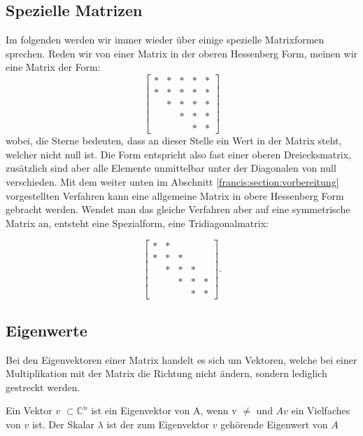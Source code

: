 \subsection{Spezielle Matrizen\label{francis:section:grundlagen:spezielle_matrizen}}
Im folgenden werden wir immer wieder über einige spezielle Matrixformen sprechen.
Reden wir von einer Matrix in der oberen Hessenberg Form, meinen wir eine Matrix der Form:
\begin{equation}
	\begin{bmatrix}
	* & * & * & * & * \\
	* & * & * & * & * \\
	& * & * & * & * \\
	&   & * & * & * \\
	&   &   & * & *
	\end{bmatrix}
\end{equation}
wobei, die Sterne bedeuten, dass an dieser Stelle ein Wert in der Matrix steht, welcher nicht null ist.
Die Form entspricht also fast einer oberen Dreiecksmatrix, zusätzlich sind aber alle Elemente unmittelbar unter der Diagonalen von null verschieden.
Mit dem weiter unten im Abschnitt \ref{francis:section:vorbereitung} vorgestellten Verfahren kann eine allgemeine Matrix in obere Hessenberg Form gebracht werden. Wendet man das gleiche Verfahren aber auf eine symmetrische Matrix an, entsteht eine Spezialform, eine Tridiagonalmatrix:

\begin{equation}
	\begin{bmatrix}
	* & * &   &   &   \\
	* & * & *  &   &   \\
	& * & * & * &  \\
	&   & * & * & * \\
	&   &   & * & *
	\end{bmatrix}.
\end{equation}

\subsection{Eigenwerte\label{francis:section:grundlagen:eigenwerte}}
Bei den Eigenvektoren einer Matrix handelt es sich um Vektoren, welche bei einer Multiplikation mit der Matrix die Richtung nicht ändern, sondern lediglich gestreckt werden.

\begin{satz}
	Ein Vektor $v$ $\subset \mathbb{C}^n$ ist ein Eigenvektor von A, wenn v $\neq$ und $Av$ ein Vielfaches von $v$ ist. Der Skalar $\lambda$ ist der zum Eigenvektor $v$ gehörende Eigenwert von $A$
\end{satz}

